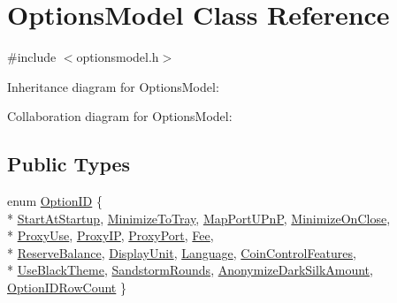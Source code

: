 \hypertarget{class_options_model}{}\section{Options\+Model Class Reference}
\label{class_options_model}


{\ttfamily \#include $<$optionsmodel.\+h$>$}



Inheritance diagram for Options\+Model\+:


Collaboration diagram for Options\+Model\+:
\subsection*{Public Types}
\begin{DoxyCompactItemize}
\item 
enum \hyperlink{class_options_model_a5c6c9ca8a01aca9f53e91f118e4878d2}{Option\+I\+D} \{ \\*
\hyperlink{class_options_model_a5c6c9ca8a01aca9f53e91f118e4878d2ae4ad9083a18b5a578a3c7ccc22629d10}{Start\+At\+Startup}, 
\hyperlink{class_options_model_a5c6c9ca8a01aca9f53e91f118e4878d2a9aff1b45ea81f0c13914643c3a03e49e}{Minimize\+To\+Tray}, 
\hyperlink{class_options_model_a5c6c9ca8a01aca9f53e91f118e4878d2adebfbde1e6e83a85acc14c15bb9309ed}{Map\+Port\+U\+Pn\+P}, 
\hyperlink{class_options_model_a5c6c9ca8a01aca9f53e91f118e4878d2a9b43debfff0527f2eb07f50ccc76e338}{Minimize\+On\+Close}, 
\\*
\hyperlink{class_options_model_a5c6c9ca8a01aca9f53e91f118e4878d2ac9218ab030ba198a6af3b08e598513cc}{Proxy\+Use}, 
\hyperlink{class_options_model_a5c6c9ca8a01aca9f53e91f118e4878d2a062b6444f3a8f03621e42a97a2311a55}{Proxy\+I\+P}, 
\hyperlink{class_options_model_a5c6c9ca8a01aca9f53e91f118e4878d2a4bcd7ddce8d2f4cad5e28ac06a60aadf}{Proxy\+Port}, 
\hyperlink{class_options_model_a5c6c9ca8a01aca9f53e91f118e4878d2a38188a662c51ec2421681d6ff95fc7f9}{Fee}, 
\\*
\hyperlink{class_options_model_a5c6c9ca8a01aca9f53e91f118e4878d2ac04c4e396e9f4f36295a36b208fbbd32}{Reserve\+Balance}, 
\hyperlink{class_options_model_a5c6c9ca8a01aca9f53e91f118e4878d2a1cdf6f58a7333e1c224b5eaccd5d17b9}{Display\+Unit}, 
\hyperlink{class_options_model_a5c6c9ca8a01aca9f53e91f118e4878d2a6b5dd4d156c9a7909b2651e0ccb56e7c}{Language}, 
\hyperlink{class_options_model_a5c6c9ca8a01aca9f53e91f118e4878d2a1bdca078b28e941f2957413a665aa1b5}{Coin\+Control\+Features}, 
\\*
\hyperlink{class_options_model_a5c6c9ca8a01aca9f53e91f118e4878d2a1804cac724fc07acaaeed3c476754c4e}{Use\+Black\+Theme}, 
\hyperlink{class_options_model_a5c6c9ca8a01aca9f53e91f118e4878d2a458ba93494f4023cbe7059b908298bea}{Sandstorm\+Rounds}, 
\hyperlink{class_options_model_a5c6c9ca8a01aca9f53e91f118e4878d2adaf654c9acd7f9eebf19e25d40af265e}{Anonymize\+Dark\+Silk\+Amount}, 
\hyperlink{class_options_model_a5c6c9ca8a01aca9f53e91f118e4878d2af11204fc4f72490fa8e35ebbeda3d743}{Option\+I\+D\+Row\+Count}
 \}
\end{DoxyCompactItemize}
